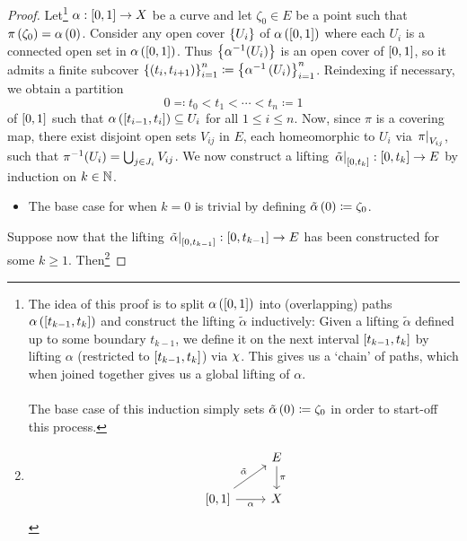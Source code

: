 \documentclass[../Moduli_Spaces_of_Riemann_Surfaces.tex]{subfiles}
\begin{document}
    \begin{proof}
        Let\footnote{The idea of this proof is to split $\alpha\left(\left[0,1\right]\right)$ into (overlapping) paths $\alpha\left(\left[t_{k-1},t_k\right]\right)$ and construct the lifting $\tilde{\alpha}$ inductively: Given a lifting $\tilde{\alpha}$ defined up to some boundary $t_{k-1}$, we define it on the next interval $\left[t_{k-1},t_k\right]$ by lifting $\alpha$ (restricted to $\left[t_{k-1},t_k\right]$) via $\cchi$. This gives us a `chain' of paths, which when joined together gives us a global lifting of $\alpha$.\\\ \\
        The base case of this induction simply sets $\tilde{\alpha}\left(0\right)\coloneqq\zeta_0$ in order to start-off this process.} $\alpha:\left[0,1\right]\to X$ be a curve and let $\zeta_0\in E$ be a point such that $\pi\left(\zeta_0\right)=\alpha\left(0\right)$. Consider any open cover $\left\{U_i\right\}$ of $\alpha\left(\left[0,1\right]\right)$ where each $U_i$ is a connected open set in $\alpha\left(\left[0,1\right]\right)$. Thus $\left\{\alpha^{-1}\!\left(U_i\right)\right\}$ is an open cover of $\left[0,1\right]$, so it admits a finite subcover $\left\{\left(t_i,t_{i+1}\right)\right\}_{i=1}^n\coloneqq\left\{\alpha^{-1}\left(U_i\right)\right\}_{i=1}^n$. Reindexing if necessary, we obtain a partition
        \begin{equation*}
            0\eqqcolon t_0<t_1<\cdots<t_n\coloneqq1
        \end{equation*}
        of $\left[0,1\right]$ such that $\alpha\left(\left[t_{i-1},t_i\right]\right)\subseteq U_i$ for all $1\leq i\leq n$. Now, since $\pi$ is a covering map, there exist disjoint open sets $V_{ij}$ in $E$, each homeomorphic to $U_i$ via $\left.\pi\right|_{V_{ij}}$, such that $\pi^{-1}\!\left(U_i\right)=\bigcup_{j\in J_i}V_{ij}$. We now construct a lifting $\left.\tilde{\alpha}\right|_{\left[0,t_k\right]}:\left[0,t_k\right]\to E$ by induction on $k\in\mathbb{N}$.
        \begin{itemize}
            \item The base case for when $k=0$ is trivial by defining $\tilde{\alpha}\left(0\right)\coloneqq\zeta_0$.
        \end{itemize}
        Suppose now that the lifting $\left.\tilde{\alpha}\right|_{\left[0,t_{k-1}\right]}:\left[0,t_{k-1}\right]\to E$ has been constructed for some $k\geq1$. Then\footnote{
            \begin{equation*}
                \begin{tikzcd}[ampersand replacement=\&]
                    \& E \ar[d, "\pi"] \\
                    \l[0,1\r] \ar[r, "\alpha"'] \ar[ur, "\tilde{\alpha}"] \& X
                \end{tikzcd}

\end{equation*}}
\end{proof}
\end{document}
